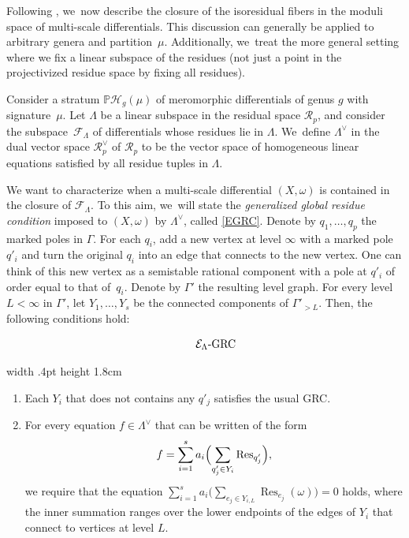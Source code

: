 \documentclass[JEP,XML,SOM,Unicode,NoFloatCountersInSection,published]{cedram}
\newcommand\PP{{\mathbb P}}
\DeclareMathOperator\Res{Res}
\theoremstyle{definition}
\begin{document}
Following \cite[\S 4.1]{CMZ}, we~now describe the closure of the isoresidual fibers in the moduli space of multi-scale differentials. This discussion can generally be applied to arbitrary genera and partition~$\mu$. Additionally, we~treat the more general setting where we fix a linear subspace of the residues (\ie not just a point in the projectivized residue space by fixing all residues).

Consider a stratum $\PP\mathcal H_{g}(\mu)$ of meromorphic differentials of genus $g$ with signature~$\mu$. Let $\Lambda$ be a linear subspace in the residual space $\mathcal{R}_{p}$, and consider the subspace~$\mathcal{F}_{\Lambda}$ of differentials whose residues lie in $\Lambda$. We~define ${\Lambda}^{\vee}$ in the dual vector space $\mathcal{R}_{p}^{\vee}$ of $\mathcal{R}_{p}$ to be the vector space of homogeneous linear equations satisfied by all residue tuples in $\Lambda$.

We want to characterize when a multi-scale differential $(X,\omega)$ is contained in the closure of $\mathcal F_\Lambda$. To this aim, we~will state the {\em generalized global residue condition} imposed to $(X,\omega)$ by $\Lambda^{\vee}$, called \ref{EGRC}.
Denote by $q_1,\ldots, q_p$ the marked poles in $\Gamma$. For each $q_i$, add a new vertex at level $\infty$ with a marked pole $q'_i$
and turn the original $q_i$ into an edge that connects to the new vertex. One can think of this new vertex as a semistable rational component with a pole at $q'_i$ of order equal to that of~$q_i$. Denote by $\Gamma'$ the resulting level graph. For every level $L < \infty$ in $\Gamma'$, let $Y_1,\ldots, Y_s$ be the connected components of $\Gamma'_{>L}$.
Then, the following conditions hold:\vspace*{3pt}

\noindent
\begin{minipage}{.13\textwidth}
\vspace*{-8pt}
\begin{equation}\tag*{$\mathcal{E}_{\Lambda}$-GRC}\label{EGRC}
\end{equation}
\end{minipage}
\vrule width .4pt height 1.8cm\;
\begin{minipage}{.85\textwidth}
\begin{enumerate}
\item\label{EGRC1}
Each $Y_i$ that does not contains any $q'_{j}$ satisfies the usual GRC.

\item\label{EGRC2}
For every equation $f\in \Lambda^{\vee}$ that can be written of the form\vspace*{-5pt}
\[
f = \sum_{i=1}^s a_i \Bigl(\sum_{q'_j\in Y_i} \mathrm{Res}_{q'_j}\Bigr),
\]
we require that the equation
$\sum_{i=1}^s a_i \bigl(\sum_{e_j \in Y_{i, L}} \Res_{e_j} (\omega)\bigr) = 0$
holds, where the inner summation ranges over the lower endpoints of the edges of $Y_i$ that connect to vertices at level $L$.
\end{enumerate}
\end{minipage}
\end{document}
